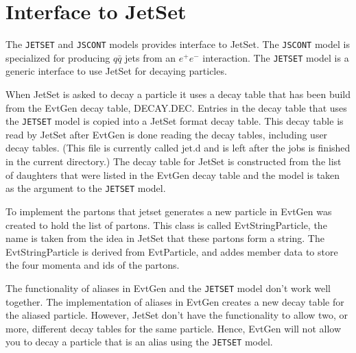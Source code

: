 \section{Interface to JetSet}
\label{sect:jetsetinterface}

The {\tt JETSET} and {\tt JSCONT} models provides interface to JetSet.
The {\tt JSCONT} model is specialized for producing $q\bar q$ jets
from an $e^+e^-$ interaction. The {\tt JETSET} model is a generic interface
to use JetSet for decaying particles. 

When JetSet is asked to decay a particle it uses a decay table that has
been build from the EvtGen decay table, DECAY.DEC. Entries in the decay
table that uses the {\tt JETSET} model is copied into a JetSet format
decay table. This decay table is read by JetSet after EvtGen is done
reading the decay tables, including user decay tables. (This file is
currently called jet.d and is left after the jobs is finished in the 
current directory.) The decay table for JetSet is constructed from the 
list of daughters that were listed in the EvtGen decay table and the
model is taken as the argument to the {\tt JETSET} model.

To implement the partons that jetset generates a new particle in EvtGen was
created to hold the list of partons. This class is called EvtStringParticle,
the name is taken from the idea in JetSet that these partons form a string.
The EvtStringParticle is derived from EvtParticle, and addes member data to
store the four momenta and ids of the partons. 

The functionality of aliases in EvtGen and the {\tt JETSET} model don't work
well together. The implementation of aliases in EvtGen creates a new decay
table for the aliased particle. However, JetSet don't have the functionality
to allow two, or more, different decay tables for the same particle. Hence,
EvtGen will not allow you to decay a particle that is an alias using the 
{\tt JETSET} model. 


